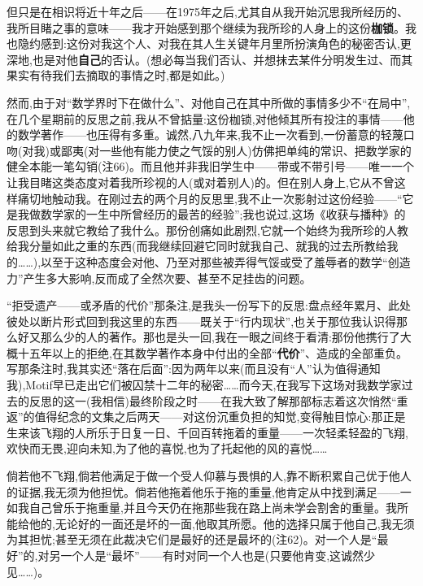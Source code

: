 但只是在相识将近十年之后——在1975年之后,尤其自从我开始沉思我所经历的、我所目睹之事的意味——我才开始感到那个继续为我所珍的人身上的这份\textbf{枷锁}。我也隐约感到:这份对我这个人、对我在其人生关键年月里所扮演角色的秘密否认,更深地,也是对他\textbf{自己}的否认。(想必每当我们否认、并想抹去\dmark{}某件分明发生过、而其果实有待我们去摘取的事情之时,都是如此。)

然而,由于对“数学界时下在做什么”、对他自己在其中所做的事情多少不“在局中”,在几个星期前的反思之前,我从不曾掂量:这份枷锁,对他倾其所有投注的事情——他的数学著作——也压得有多重。诚然,八九年来,我不止一次看到,一份蓄意的轻蔑口吻(对我)或鄙夷(对一些他有能力使之气馁的别人)仿佛把单纯的常识、把数学家的健全本能一笔勾销(注66)。而且他并非我旧学生中——带或不带引号——唯一一个让我目睹这类态度对着我所珍视的人(或对着别人)的。但在别人身上,它从不曾这样痛切地触动我。在刚过去的两个月的反思里,我不止一次影射过这份经验——“它是我做数学家的一生中所曾经历的最苦的经验”;我也说过,这场《收获与播种》的反思到头来就它教给了我什么。那份创痛如此剧烈,它就一个始终为我所珍的人教给我分量如此之重的东西(而我继续回避它同时就我自己、就我的过去所教给我的……),以至于这种态度会对他、乃至对那些被弄得气馁或受了羞辱者的数学“创造力”产生多大影响,反而成了全然次要、甚至不足挂齿的问题。

“拒受遗产——或矛盾的代价”那条注,是我头一份写下的反思:盘点经年累月、此处彼处以断片形式回到我这里的东西——既关于“行内现状”,也关于那位我认识得那么好又那么少的人的著作。那也是头一回,我在一眼之间终于看清:那份他携行了大概十五年以上的拒绝,在其数学著作本身中付出的全部“\textbf{代价}”、造成的全部重负。写那条注时,我其实还“落在后面”:因为两年以来(而且没有“人”认为值得通知我),Motif早已走出它们被囚禁十二年的秘密……而今天,在我写下这场对我数学家过去的反思的这一(我相信)最终阶段之时——在我\dmark{}大致了解那部标志着这次悄然“重返”的值得纪念的文集之后两天——对这份沉重负担的知觉,变得触目惊心:那正是生来该飞翔的人所乐于日复一日、千回百转拖着的重量——一次轻柔轻盈的飞翔,欢快而无畏,迎向未知,为了他的喜悦,也为了托起他的风的喜悦……

倘若他不飞翔,倘若他满足于做一个受人仰慕与畏惧的人,靠不断积累自己优于他人的证据,我无须为他担忧。倘若他拖着他乐于拖的重量,他肯定从中找到满足——一如我自己曾乐于拖重量,并且今天仍在拖那些我在路上尚未学会割舍的重量。我所能给他的,无论好的一面还是坏的一面,他取其所愿。他的选择只属于他自己,我无须为其担忧;甚至无须在此裁决它们是最好的还是最坏的(注62)。对一个人是“最好”的,对另一个人是“最坏”——有时对同一个人也是(只要他肯变,这诚然少见……)。


